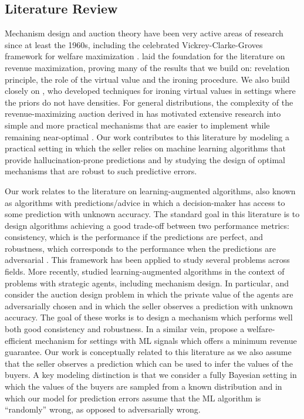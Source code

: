 \subsection{Literature Review}\label{sec:lit_review}
  Mechanism design and auction theory have been very active areas of research since at least the 1960s, including the celebrated Vickrey-Clarke-Groves framework for welfare maximization \citep{vickrey1961counterspeculation,clarke1971multipart,groves1973incentives}. 
  \citet{myerson1981optimal} laid the foundation for the literature on revenue maximization, proving many of the results that we build on: revelation principle, the role of the virtual value and the ironing procedure. We also build closely on \citet{monteiro2010optimal}, who developed techniques for ironing virtual values in settings where the priors do not have densities. 
  For general distributions, the complexity of the revenue-maximizing auction derived in \citet{myerson1981optimal} has motivated extensive research into simple and more practical mechanisms that are easier to implement while remaining near-optimal \citep{hartline2009simple,roughgarden2019approximately}. 
  Our work contributes to this literature by modeling a practical setting in which the seller relies on machine learning algorithms that provide hallucination-prone predictions and by studying the design of optimal mechanisms that are robust to such predictive errors.
  

Our work relates to the literature on learning-augmented algorithms, also known as algorithms with predictions/advice in which a decision-maker has access to some prediction with unknown accuracy. The standard goal in this literature is to design algorithms achieving a good trade-off between two performance metrics: consistency, which is the performance if the predictions are perfect, and robustness, which corresponds to the performance when the predictions are adversarial \citep{purohit2018improving,lykouris2021competitive}. This framework has been applied to study several problems across fields. More recently, \citep{agrawal2022learning,balkanski2022strategyproof,gkatzelis2022improved,banerjee2022online,xu2022mechanism} studied learning-augmented algorithms in the context of problems with strategic agents, including mechanism design.  In particular, \cite{xu2022mechanism,balkanski2023online,caragiannis2024randomized} and \citet{lu2024competitive} consider the auction design problem in which the private value of the agents are adversarially chosen and in which the seller observes a prediction with unknown accuracy. The goal of these works is to design a mechanism which performs well both good consistency and robustness. In a similar vein, \citet{balcan2023bicriteria} propose a welfare-efficient mechanism for settings with ML signals which offers a minimum revenue guarantee. Our work is conceptually related to this literature as we also assume that the seller observes a prediction which can be used to infer the values of the buyers. A key modeling distinction is that we consider a fully Bayesian setting in which the values of the buyers are sampled from a known distribution and in which our model for prediction errors assume that the ML algorithm is ``randomly'' wrong, as opposed to adversarially wrong.

